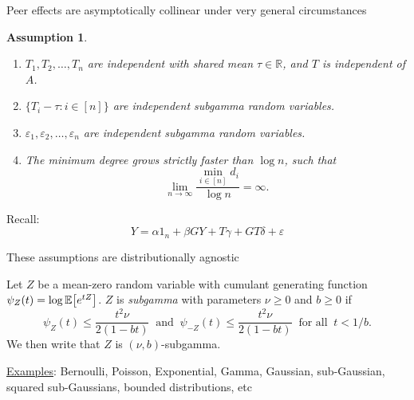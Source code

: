 \documentclass[aspectratio=169]{beamer}
\newcommand{\R}{\mathbb{R}}
\newcommand{\E}[2][]{%
	\ifthenelse{ \equal{#1}{} }
	{\ensuremath{\mathbb{E} \brac*{#2}}}
	{\ensuremath{\mathbb{E} \brac*{#2 \, \middle \vert \, #1}}}
}
\DeclarePairedDelimiter{\brac}{[}{]}
\newtheorem{assumption}{Assumption}
\theoremstyle{remark}
\begin{document}
\begin{frame}{Peer effects are asymptotically collinear under very general circumstances}
    \begin{assumption}
        \begin{enumerate}
            \item $T_1,T_2,\dots,T_n$ are independent with shared mean $\tau \in \R$, and $T$ is independent of $A$.
            \item $\{ T_i - \tau : i \in [n] \}$ are independent subgamma random variables.
            \item $\varepsilon_1, \varepsilon_2, \dots, \varepsilon_n$ are independent subgamma random variables.
            \item The minimum degree grows strictly faster than $\log n$, such that
                  \begin{equation*}
                      \lim_{n \to \infty} \frac{\min_{i \in [n]} d_i}{\log n} = \infty.
                  \end{equation*}
        \end{enumerate}
    \end{assumption}
    
    Recall: 
    \Large
    \begin{equation*}
        Y = \alpha 1_n + \beta G Y + T \gamma + G T \delta + \varepsilon
    \end{equation*}
\end{frame}

\begin{frame}{These assumptions are distributionally agnostic}
    \begin{definition}
        Let $Z$ be a mean-zero random variable with cumulant generating function $\psi_Z(t) = \log \E{e^{t Z}}$.
        $Z$ is \emph{subgamma} with parameters $\nu \ge 0$ and $b \ge 0$ if
        \begin{equation*}
            \psi_Z(t) \le \frac{t^2 \nu}{2 (1 - b t)}
            ~\text{ and }~
            \psi_{-Z}(t) \le \frac{t^2 \nu}{2 (1 - b t)}
            ~\text{ for all }~ t < 1 / b.
        \end{equation*}
        We then write that $Z$ is $(\nu,b)$-subgamma.
    \end{definition}
    \vspace{4mm}
    \underline{Examples}: Bernoulli, Poisson, Exponential, Gamma, Gaussian, sub-Gaussian, squared sub-Gaussians, bounded distributions, etc
\end{frame}
\end{document}
